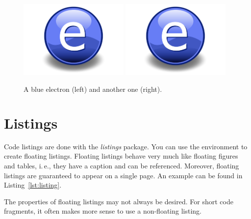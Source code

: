 \begin{figure}[t]
\centering
\includegraphics[width=0.48\textwidth]{Figures/Electron}%
\hspace{\fill}%
\includegraphics[width=0.48\textwidth]{Figures/Electron}
\decoRule
\caption{A blue electron (left) and another one (right).}
\label{fig:sidebyside}
\end{figure}


\section{Listings}

Code listings are done with the \emph{listings} package. You can use the environment  to create floating listings. Floating listings behave very much like floating figures and tables, i.\,e., they have a caption and can be referenced. Moreover, floating listings are guaranteed to appear on a single page. An example can be found in Listing~\ref{lst:listing}.

The properties of floating listings may not always be desired. For short code fragments, it often makes more sense to use a non-floating listing.

